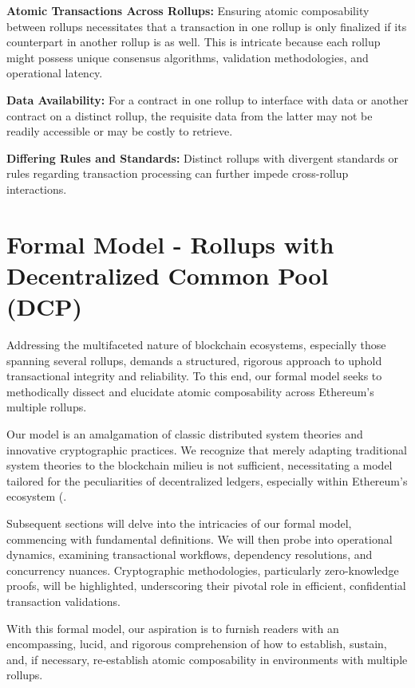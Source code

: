 \documentclass{article}
\begin{document}
\textbf{Atomic Transactions Across Rollups:} Ensuring atomic
composability between rollups necessitates that a transaction in one
rollup is only finalized if its counterpart in another rollup is as
well. This is intricate because each rollup might possess unique
consensus algorithms, validation methodologies, and operational latency.

\textbf{Data Availability:} For a contract in one rollup to interface
with data or another contract on a distinct rollup, the requisite data
from the latter may not be readily accessible or may be costly to
retrieve.

\textbf{Differing Rules and Standards:} Distinct rollups with divergent
standards or rules regarding transaction processing can further impede
cross-rollup interactions.

\section{Formal Model - Rollups with Decentralized Common Pool
(DCP)}\label{formal-model-for-rollups-with-decentralized-common-pool-dcp}

Addressing the multifaceted nature of blockchain ecosystems, especially
those spanning several rollups, demands a structured, rigorous approach
to uphold transactional integrity and reliability. To this end, our
formal model seeks to methodically dissect and elucidate atomic
composability across Ethereum's multiple rollups.

Our model is an amalgamation of classic distributed system theories and
innovative cryptographic practices. We recognize that merely adapting
traditional system theories to the blockchain milieu is not sufficient,
necessitating a model tailored for the peculiarities of decentralized
ledgers, especially within Ethereum's ecosystem (\cite{narayanan2016bitcoin}.

Subsequent sections will delve into the intricacies of our formal model,
commencing with fundamental definitions. We will then probe into
operational dynamics, examining transactional workflows, dependency
resolutions, and concurrency nuances. Cryptographic methodologies,
particularly zero-knowledge proofs, will be highlighted, underscoring
their pivotal role in efficient, confidential transaction validations.

With this formal model, our aspiration is to furnish readers with an
encompassing, lucid, and rigorous comprehension of how to establish,
sustain, and, if necessary, re-establish atomic composability in
environments with multiple rollups.
\end{document}
